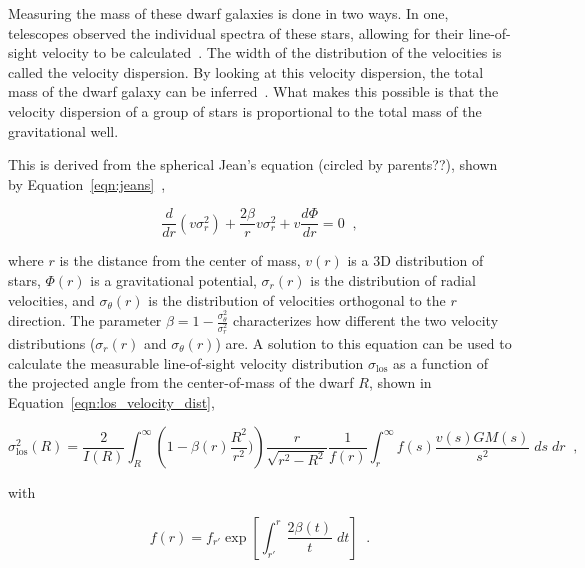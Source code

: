 Measuring the mass of these dwarf galaxies is done in two ways.
In one, telescopes observed the individual spectra of these stars, allowing for their line-of-sight velocity to be calculated~\cite{dwarf_gal_red_giant}.
The width of the distribution of the velocities is called the velocity dispersion.
By looking at this velocity dispersion, the total mass of the dwarf galaxy can be inferred~\cite{dwarf_gal_vel_dispersion, dwarf_gal_vel_dispersion2}.
What makes this possible is that the velocity dispersion of a group of stars is proportional to the total mass of the gravitational well.

This is derived from the {\color{red}spherical Jean's equation (circled by parents??)}, shown by Equation~\ref{eqn:jeans}~\cite{galactic_dynamics},

\begin{equation}\label{eqn:jeans}
  \frac{d}{dr} \left ( v \sigma_r^2\right) + \frac{2 \beta}{r}v \sigma_r^2 + v \frac{d \Phi}{dr}=0 \;\; ,
\end{equation}

where $r$ is the distance from the center of mass, $v(r)$ is a 3D distribution of stars, $\Phi(r)$ is a gravitational potential, $\sigma_r(r)$ is the distribution of radial velocities, and $\sigma_\theta(r)$ is the distribution of velocities orthogonal to the $r$ direction.
The parameter $\beta = 1 - \frac{\sigma_{\theta}^2}{\sigma_r^2}$ characterizes how different the two velocity distributions ($\sigma_r(r)$ and $\sigma_{\theta}(r)$) are.
A solution to this equation can be used to calculate the measurable line-of-sight velocity distribution $\sigma_{\mathrm{los}}$ as a function of the projected angle from the center-of-mass of the dwarf $R$, shown in Equation~\ref{eqn:los_velocity_dist},

\begin{equation}\label{eqn:los_velocity_dist}
  \sigma_{\mathrm{los}}^2 \left ( R \right ) = \frac{2}{I(R)} \int_R^{\infty} \left ( 1 - \beta(r) \frac{R^2}{r^2}) \right ) \frac{r}{\sqrt{r^2-R^2}} \frac{1}{f(r)} \int_r^\infty f(s) \frac{v(s)GM(s)}{s^2} \; ds\; dr \;\; ,
\end{equation}

with

\begin{equation}\label{eqn:los_velocity_dist2}
  f(r) = f_{r'} \exp \left [ \int_{r'}^r \frac{2 \beta(t) }{t} \; dt \right ] \;\; .
\end{equation}

